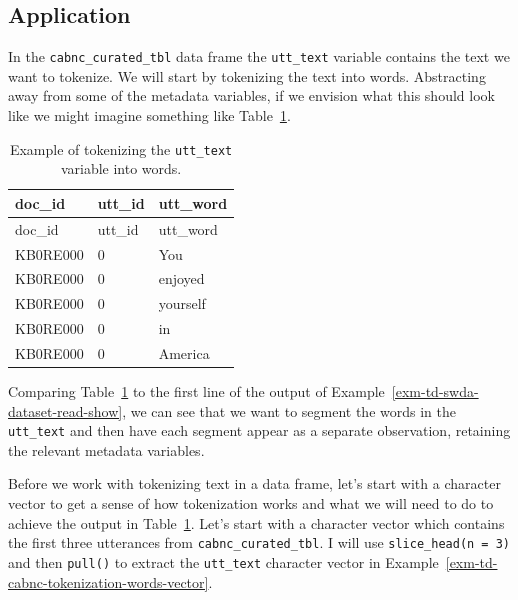 \documentclass[
  letterpaper,
  DIV=11,
  numbers=noendperiod]{scrreport}
\theoremstyle{definition}
\theoremstyle{remark}
\begin{document}
\hypertarget{sec-td-tokenization-application}{%
\subsection{Application}\label{sec-td-tokenization-application}}

In the \texttt{cabnc\_curated\_tbl} data frame the \texttt{utt\_text}
variable contains the text we want to tokenize. We will start by
tokenizing the text into words. Abstracting away from some of the
metadata variables, if we envision what this should look like we might
imagine something like
Table~\ref{tbl-td-cabnc-tokenization-words-example}.

\hypertarget{tbl-td-cabnc-tokenization-words-example}{}
\begin{longtable}[]{@{}lll@{}}
\caption{\label{tbl-td-cabnc-tokenization-words-example}Example of
tokenizing the \texttt{utt\_text} variable into words.}\tabularnewline
\toprule\noalign{}
doc\_id & utt\_id & utt\_word \\
\midrule\noalign{}
\endfirsthead
\toprule\noalign{}
doc\_id & utt\_id & utt\_word \\
\midrule\noalign{}
\endhead
\bottomrule\noalign{}
\endlastfoot
KB0RE000 & 0 & You \\
KB0RE000 & 0 & enjoyed \\
KB0RE000 & 0 & yourself \\
KB0RE000 & 0 & in \\
KB0RE000 & 0 & America \\
\end{longtable}

Comparing Table~\ref{tbl-td-cabnc-tokenization-words-example} to the
first line of the output of Example~\ref{exm-td-swda-dataset-read-show},
we can see that we want to segment the words in the \texttt{utt\_text}
and then have each segment appear as a separate observation, retaining
the relevant metadata variables.

Before we work with tokenizing text in a data frame, let's start with a
character vector to get a sense of how tokenization works and what we
will need to do to achieve the output in
Table~\ref{tbl-td-cabnc-tokenization-words-example}. Let's start with a
character vector which contains the first three utterances from
\texttt{cabnc\_curated\_tbl}. I will use \texttt{slice\_head(n\ =\ 3)}
and then \texttt{pull()} to extract the \texttt{utt\_text} character
vector in Example~\ref{exm-td-cabnc-tokenization-words-vector}.
\end{document}
